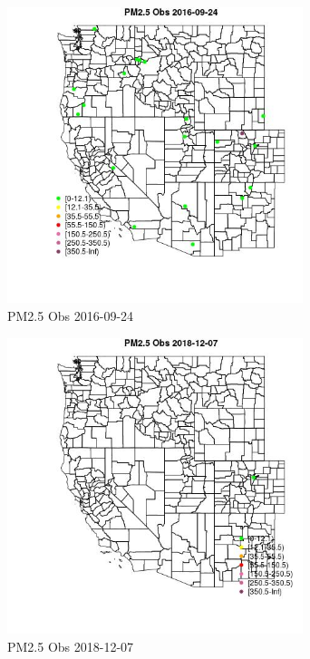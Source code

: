 \begin{figure} 
\centering  
\includegraphics[width=0.77\textwidth]{Code_Outputs/Report_ML_input_PM25_Step4_part_e_de_duplicated_aves_MapObsPM25_Obs2016-09-24.jpg} 
\caption{\label{fig:Report_ML_input_PM25_Step4_part_e_de_duplicated_avesMapObsPM25_Obs2016-09-24}PM2.5 Obs 2016-09-24} 
\end{figure} 
 

\begin{figure} 
\centering  
\includegraphics[width=0.77\textwidth]{Code_Outputs/Report_ML_input_PM25_Step4_part_e_de_duplicated_aves_MapObsPM25_Obs2018-12-07.jpg} 
\caption{\label{fig:Report_ML_input_PM25_Step4_part_e_de_duplicated_avesMapObsPM25_Obs2018-12-07}PM2.5 Obs 2018-12-07} 
\end{figure} 
 

